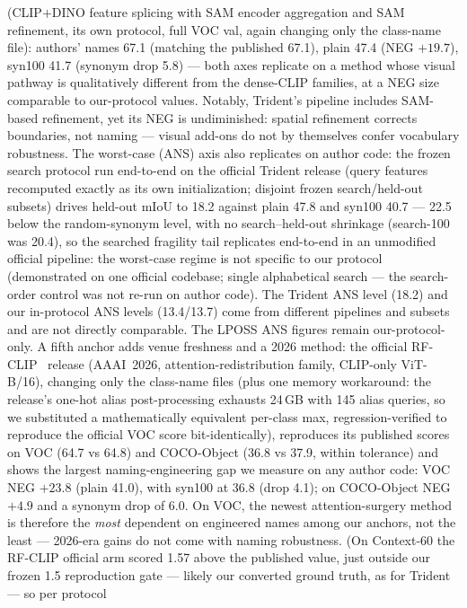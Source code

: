 \documentclass[11pt]{article}
\newcommand{\miou}{mIoU}
\begin{document}
(CLIP$+$DINO feature splicing with SAM \citep{kirillov2023sam} encoder aggregation and SAM
refinement, its own protocol, full VOC val, again changing only the
class-name file): authors' names 67.1 (matching the published 67.1),
plain 47.4 (NEG $+19.7$), syn100 41.7 (synonym drop 5.8) --- both axes
replicate on a method whose visual pathway is qualitatively different from
the dense-CLIP families, at a NEG size comparable to our-protocol values.
Notably, Trident's pipeline includes SAM-based refinement, yet its NEG is
undiminished: spatial refinement corrects boundaries, not naming --- visual
add-ons do not by themselves confer vocabulary robustness.
The worst-case (ANS) axis also replicates on author code: the frozen search
protocol run end-to-end on the official Trident release (query features
recomputed exactly as its own initialization; disjoint frozen
search/held-out subsets) drives held-out \miou{} to 18.2 against plain 47.8
and syn100 40.7 --- 22.5 below the random-synonym level, with no
search--held-out shrinkage (search-100 was 20.4), so the searched fragility
tail replicates end-to-end in an unmodified official pipeline: the
worst-case regime is not specific to our protocol (demonstrated on one
official codebase; single alphabetical search --- the search-order control
was not re-run on author code). The Trident ANS level (18.2) and our
in-protocol ANS levels (13.4/13.7) come from different pipelines and
subsets and are not directly comparable. The LPOSS ANS figures remain
our-protocol-only. A fifth anchor adds venue freshness and a 2026 method: the official
RF-CLIP~\cite{li2026rfclip} release (AAAI~2026, attention-redistribution
family, CLIP-only ViT-B/16), changing only the class-name files (plus one
memory workaround: the release's one-hot alias post-processing exhausts
24\,GB with 145 alias queries, so we substituted a mathematically
equivalent per-class max, regression-verified to reproduce the official
VOC score bit-identically), reproduces its published scores on VOC (64.7
vs 64.8) and COCO-Object (36.8 vs 37.9, within tolerance) and shows the
largest naming-engineering gap we measure on any author code: VOC NEG
$+23.8$ (plain 41.0), with
syn100 at 36.8 (drop 4.1); on COCO-Object NEG $+4.9$ and a synonym drop
of 6.0. On VOC, the newest attention-surgery method is therefore the
\emph{most} dependent on engineered names among our anchors, not the least
--- 2026-era gains do not come with naming robustness. (On Context-60 the RF-CLIP official arm scored 1.57
above the published value, just outside our frozen 1.5 reproduction gate
--- likely our converted ground truth, as for Trident --- so per protocol
\end{document}
